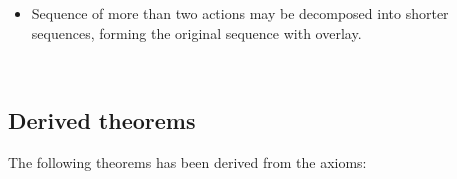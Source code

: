 \begin{itemize}
{\begin{hscode}
\\
\>[3]{}\<[5]%
\>[5]{}\;\D{\seq}\;(\;\D{+}\;)\;\;\;\D{\seq}\;\;\D{+}\;\;\D{\seq}\;\<[E]%
\\
\>[3]{}\;\mathbin{:}\;\;\;\;\;\;{}\<[E]%
\\
\>[3]{}\<[5]%
\>[5]{}(\;\D{+}\;)\;\D{\seq}\;\;\;\;\D{\seq}\;\;\D{+}\;\;\D{\seq}\;\<[E]%
\ColumnHook
\end{hscode}\resethooks
}
\item{Sequence of more than two actions may be decomposed into shorter sequences, 
forming the original sequence with overlay.
\begin{hscode}\SaveRestoreHook
{}%
%
%
%
\>[3]{}\;\mathbin{:}\;\;\;\;\;\;{}\<[E]%
\\
\>[3]{}\<[19]%
\>[19]{}\;\D{\seq}\;\;\D{\seq}\;\;\;\;\D{\seq}\;\;\D{+}\;\;\D{\seq}\;\;\D{+}\;\;\D{\seq}\;\<[E]%
\ColumnHook
\end{hscode}\resethooks
}
\end{itemize}

\subsection{Derived theorems}


The following theorems has been derived from the axioms:

